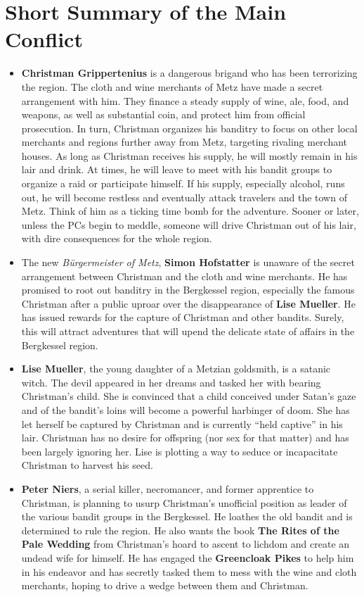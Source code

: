 \documentclass[
]{book}
\begin{document}
\section{Short Summary of the Main Conflict}\label{short-summary-of-the-main-conflict}

\begin{itemize}
\item
  \textbf{Christman Grippertenius} is a dangerous brigand who has been terrorizing the region. The cloth and wine merchants of Metz have made a secret arrangement with him. They finance a steady supply of wine, ale, food, and weapons, as well as substantial coin, and protect him from official prosecution. In turn, Christman organizes his banditry to focus on other local merchants and regions further away from Metz, targeting rivaling merchant houses. As long as Christman receives his supply, he will mostly remain in his lair and drink. At times, he will leave to meet with his bandit groups to organize a raid or participate himself. If his supply, especially alcohol, runs out, he will become restless and eventually attack travelers and the town of Metz. Think of him as a ticking time bomb for the adventure. Sooner or later, unless the PCs begin to meddle, someone will drive Christman out of his lair, with dire consequences for the whole region.
\item
  The new \emph{Bürgermeister of Metz}, \textbf{Simon Hofstatter} is unaware of the secret arrangement between Christman and the cloth and wine merchants. He has promised to root out banditry in the Bergkessel region, especially the famous Christman after a public uproar over the disappearance of \textbf{Lise Mueller}. He has issued rewards for the capture of Christman and other bandits. Surely, this will attract adventures that will upend the delicate state of affairs in the Bergkessel region.
\item
  \textbf{Lise Mueller}, the young daughter of a Metzian goldsmith, is a satanic witch. The devil appeared in her dreams and tasked her with bearing Christman's child. She is convinced that a child conceived under Satan's gaze and of the bandit's loins will become a powerful harbinger of doom. She has let herself be captured by Christman and is currently ``held captive'' in his lair. Christman has no desire for offspring (nor sex for that matter) and has been largely ignoring her. Lise is plotting a way to seduce or incapacitate Christman to harvest his seed.
\item
  \textbf{Peter Niers}, a serial killer, necromancer, and former apprentice to Christman, is planning to usurp Christman's unofficial position as leader of the various bandit groups in the Bergkessel. He loathes the old bandit and is determined to rule the region. He also wants the book \textbf{The Rites of the Pale Wedding} from Christman's hoard to ascent to lichdom and create an undead wife for himself. He has engaged the \textbf{Greencloak Pikes} to help him in his endeavor and has secretly tasked them to mess with the wine and cloth merchants, hoping to drive a wedge between them and Christman.

\end{itemize}
\end{document}
